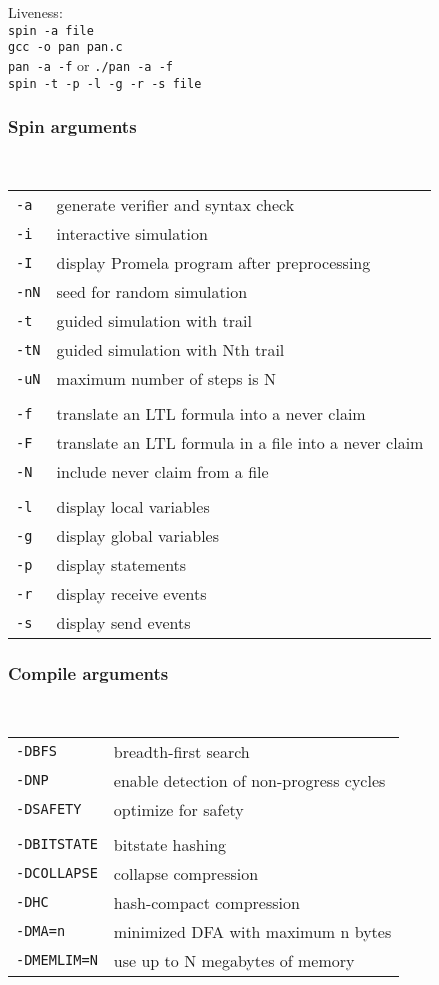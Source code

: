 \documentclass{leaflet}
\newcommand{\sct}[1]{\subsubsection{#1}\mbox{}\\}
\newcommand{\spc}{\hspace*{1.5em}}
\begin{document}
\newpage

Liveness:\\
\spc{}\verb+spin -a file+\\
\spc{}\verb+gcc -o pan pan.c+\\
\spc{}\verb+pan -a -f+ or \verb+./pan -a -f+\\
\spc{}\verb+spin -t -p -l -g -r -s file+

\sct{Spin arguments}
\begin{tabular}{ll}
\texttt{-a} & generate verifier and syntax check\\
\texttt{-i} & interactive simulation\\
\texttt{-I} & display Promela program after preprocessing\\
\texttt{-nN} & seed for random simulation\\
\texttt{-t} & guided simulation with trail\\
\texttt{-tN} & guided simulation with Nth trail\\
\texttt{-uN} & maximum number of steps is N\\
&\\
\texttt{-f} & translate an LTL formula into a never claim\\
\texttt{-F} & translate an LTL formula in a file into a never claim\\
\texttt{-N} & include never claim from a file\\
&\\
\texttt{-l} & display local variables\\
\texttt{-g} & display global variables\\
\texttt{-p} & display statements\\
\texttt{-r} & display receive events\\
\texttt{-s} & display send events
\end{tabular}

\sct{Compile arguments}
\begin{tabular}{ll}
\texttt{-DBFS} & breadth-first search\\
\texttt{-DNP} & enable detection of non-progress cycles\\
\texttt{-DSAFETY} & optimize for safety\\
\\
\texttt{-DBITSTATE} & bitstate hashing\\
\texttt{-DCOLLAPSE} & collapse compression\\
\texttt{-DHC} & hash-compact compression\\
\texttt{-DMA=n} & minimized DFA with maximum n bytes\\
\texttt{-DMEMLIM=N} & use up to N megabytes of memory
\end{tabular}
\end{document}
